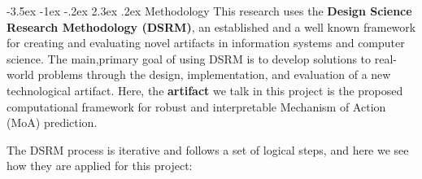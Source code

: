 \documentclass[12pt,a4paper]{article}
\makeatletter
\renewcommand\section{\@startsection{section}{1}{\z@}%
  {-3.5ex \@plus-1ex \@minus-.2ex}%
  {2.3ex \@plus.2ex}%
  {\normalfont\large\bfseries}}
\makeatother
\begin{document}
\section{Methodology}
This research uses the \textbf{Design Science Research Methodology (DSRM)}, an established and a well known framework for creating and evaluating novel artifacts in information systems and computer science. The main,primary goal of using DSRM is to develop solutions to real-world problems through the design, implementation, and evaluation of a new technological artifact. Here, the \textbf{artifact} we talk in this project is the proposed computational framework for robust and interpretable Mechanism of Action (MoA) prediction.

The DSRM process is iterative and follows a set of logical steps, and here we see how they are applied for this project:
\end{document}
